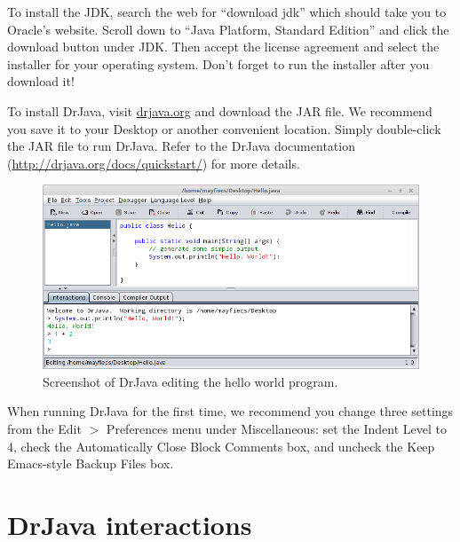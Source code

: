 \documentclass[12pt]{book}
\theoremstyle{exercise}
\begin{document}
To install the JDK, search the web for ``download jdk'' which should take you to Oracle's website.
Scroll down to ``Java Platform, Standard Edition'' and click the download button under JDK.
Then accept the license agreement and select the installer for your operating system. Don't forget to run the installer after you download it!

To install DrJava, visit \url{drjava.org} and download the JAR file.
We recommend you save it to your Desktop or another convenient location.
Simply double-click the JAR file to run DrJava.
Refer to the DrJava documentation (\url{http://drjava.org/docs/quickstart/}) for more details.

\begin{figure}[!ht]
\begin{center}
\includegraphics[width=\textwidth]{figs/drjava-hello.png}
\caption{Screenshot of DrJava editing the hello world program.}
\label{fig.drjava1}
\end{center}
\end{figure}

When running DrJava for the first time, we recommend you change three settings from the {\sf Edit $>$ Preferences} menu under {\sf Miscellaneous}: set the {\sf Indent Level} to 4, check the {\sf Automatically Close Block Comments} box, and uncheck the {\sf Keep Emacs-style Backup Files} box.




\section{DrJava interactions}
\label{interactions}
\end{document}
